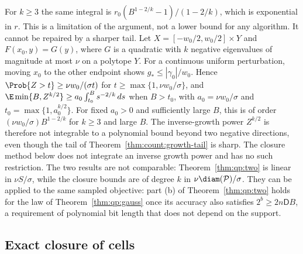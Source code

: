 \begin{remark}\label{rem:qp:moments}
For $k\ge3$ the same integral is
$r_0(B^{1-2/k}-1)/(1-2/k)$, which is exponential in $r$. This is a limitation
of the argument, not a lower bound for any algorithm. It cannot be repaired by
a sharper tail. Let $X=[-w_0/2,w_0/2]\times Y$ and $F(x_0,y)=G(y)$, where $G$
is a quadratic with $k$ negative eigenvalues of magnitude at most $\nu$ on a
polytope $Y$. For a continuous uniform perturbation, moving $x_0$ to the other
endpoint shows $g_*\le|\gamma_0|/w_0$. Hence
$\Prob\{Z>t\}\ge\nu w_0/(\sigma t)$ for $t\ge\max\{1,\nu w_0/\sigma\}$, and
$\E\min\{B,Z^{k/2}\}\ge a_0\int_{t_0}^Bs^{-2/k}\,ds$ when $B>t_0$, with
$a_0=\nu w_0/\sigma$ and $t_0=\max\{1,a_0^{k/2}\}$. For fixed $a_0>0$ and
sufficiently large $B$, this is of order
$(\nu w_0/\sigma)B^{1-2/k}$ for $k\ge3$ and large $B$. The inverse-growth
power $Z^{k/2}$ is therefore not integrable to a polynomial bound beyond two
negative directions, even though the tail of
Theorem~\ref{thm:count:growth-tail} is sharp. The closure method below does
not integrate an inverse growth power and has no such restriction. The two
results are not comparable: Theorem~\ref{thm:qp:two} is linear in
$\nu S/\sigma$, while the closure bounds are of degree $k$ in
$\nu\diam(\mathcal P)/\sigma$. They can be applied to the same sampled
objective: part (b) of Theorem~\ref{thm:qp:two} holds for the law of
Theorem~\ref{thm:qp:gauss} once its accuracy also satisfies
$2^b\ge2n\mathsf DB$, a requirement of polynomial bit length that does not
depend on the support.
\end{remark}

\subsection{Exact closure of cells}\label{sec:qp:closure}

